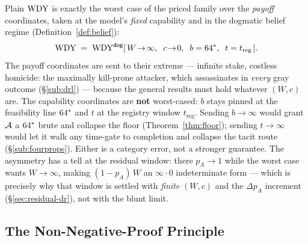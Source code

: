 \begin{remark}\label{rem:worstcase}
Plain $\mathrm{WDY}$ is exactly the worst case of the priced family over the
\emph{payoff} coordinates, taken at the model's \emph{fixed} capability and in
the dogmatic belief regime (Definition~\ref{def:belief}):
\[
  \mathrm{WDY} \;=\; \mathrm{WDY}^{\mathsf{dog}}[\,W\!\to\!\infty,\;\; c\!\to\!0,\;\; b = 64^{*},\;\; t = t_{\mathrm{reg}}\,].
\]
The payoff coordinates are sent to their extreme --- infinite stake, costless
homicide: the maximally kill-prone attacker, which assassinates in \emph{every}
gray outcome (\S\ref{sub:drl}) --- because the general results must hold whatever
$(W,c)$ are. The capability coordinates are \textbf{not} worst-cased: $b$ stays
pinned at the feasibility line $64^{*}$ and $t$ at the registry window
$t_{\mathrm{reg}}$. Sending $b \to \infty$ would grant $\mathcal{A}$ a $64^{*}$
brute and collapse the floor (Theorem~\ref{thm:floor}); sending $t \to \infty$
would let it walk any time-gate to completion and collapse the tacit route
(\S\ref{sub:fourprops}). Either is a category error, not a stronger guarantee. The asymmetry has a tell at the residual
window: there $p_A \to 1$ while the worst case wants $W \to \infty$, making
$(1-p_A)\,W$ an $\infty\cdot 0$ indeterminate form --- which is precisely why that
window is settled with \emph{finite} $(W,c)$ and the $\Delta p_A$ increment
(\S\ref{sec:residual-dr}), not with the blunt limit.
\end{remark}

\subsection{The Non-Negative-Proof Principle}
\label{sub:nnpl}

